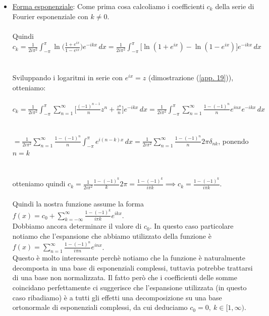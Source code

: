 \documentclass[a4paper,12pt]{report}
\begin{document}
\begin{itemize}
    \item\underline{Forma esponenziale}: Come prima cosa calcoliamo i coefficienti $c_k$ della serie di Fourier esponenziale con $k\neq 0$.
    \\
    \\ Quindi $c_k=\displaystyle\frac{1}{2 i\pi^2}\int_{-\pi}^\pi\ln\bigg(\frac{1+e^{ix}}{1-e^{ix}}\bigg)e^{-ikx}\,dx=\frac{1}{2i\pi^2}\int_{-\pi}^\pi\bigg[\ln(1+e^{ix})-\ln(1-e^{ix})\bigg]e^{-ikx}\,dx$
    \\
    \\
    \\Sviluppando i logaritmi in serie con $e^{ix}=z$ (dimostrazione  (\ref{app. 19})), otteniamo:
    \\
    \\ $c_k=\displaystyle\frac{1}{2i\pi^2}\int_{-\pi}^\pi\sum_{n=1}^\infty\bigg[\frac{(-1)^{n-1}}{n}z^n+\frac{z^n}{n}\bigg]e^{-ikx}\,dx=\frac{1}{2i\pi^2}\int_{-\pi}^\pi\sum_{n=1}^\infty\frac{1-(-1)^n}{n}e^{inx}e^{-ikx}\,dx$
    \\
    \\
    \\$=\displaystyle\frac{1}{2i\pi^2}\sum_{n=1}^\infty\frac{1-(-1)^n}{n}\int_{-\pi}^\pi e^{i(n-k)x}\,dx=\frac{1}{2i\pi^2}\sum_{n=1}^\infty\frac{1-(-1)^n}{n}2\pi \delta_{nk}$, ponendo $n=k$ 
    \\
    \\
    \\otteniamo quindi $c_k=\displaystyle\frac{1}{2i\pi^2}\frac{1-(-1)^k}{k}2\pi=\frac{1-(-1)^k}{i\pi k}\implies c_k=\frac{1-(-1)^k}{i\pi k}$.
    \\
    \\ Quindi la nostra funzione assume la forma $f(x)=c_0+\displaystyle\sum_{k=-\infty}^\infty\frac{1-(-1)^k}{i\pi k}e^{ikx}$. 
    \\Dobbiamo ancora determinare il valore di $c_0$. In questo caso particolare notiamo che l'espansione che abbiamo utilizzato della funzione è $f(x)=\displaystyle\sum_{n=1}^\infty\frac{1-(-1)^n}{i\pi n}e^{inx}$. 
    \\Questo è molto interessante perchè notiamo che la funzione è naturalmente decomposta in una base di esponenziali complessi, tuttavia potrebbe trattarsi di una base non normalizzata. Il fatto però che i coefficienti delle somme coincidano perfettamente ci suggerisce che l'espansione utilizzata (in questo caso ribadiamo) è a tutti gli effetti una decomposizione su una base ortonormale di esponenziali complessi, da cui deduciamo $c_0=0, \ k\in[1,\infty).$

\end{itemize}
\end{document}
